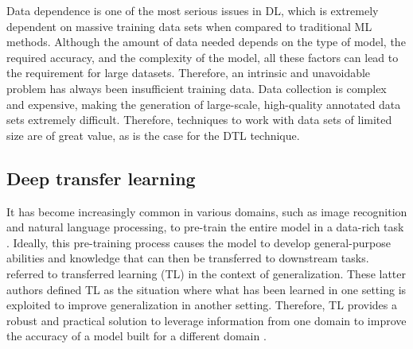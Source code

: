 \documentclass{aa}
\begin{document}
Data dependence is one of the most serious issues in DL, which is extremely dependent on massive training data {sets} when compared to traditional ML methods.
Although the amount of data needed depends on the type of model, the required accuracy, and the complexity of the model, all these factors can lead to the requirement for large datasets.
Therefore, an intrinsic and unavoidable problem has always been insufficient training data. Data collection is complex and expensive, making the generation of large-scale, high-quality annotated data sets extremely difficult. Therefore, techniques to work with data sets of limited size are of great value, as is the case for the DTL technique.


\subsection{Deep transfer learning} 
\label{sect:deep.transfer.learning}

It has become increasingly common in various domains, such as image recognition and natural language processing, to pre-train the entire model in a data-rich task \citep{kraus2017decision,gao2018deep,raffel2019exploring,HAN2021225}. 
Ideally, this pre-training process causes the model to develop general-purpose abilities and knowledge that can then be transferred to downstream tasks. 
\citet{Goodfellow-et-al-2016} referred to {transferred learning} (TL) in the context of generalization. 
These latter authors defined TL as the situation where what has been learned in one setting is exploited to improve generalization in another setting. Therefore, TL provides a robust and practical solution to leverage information from one domain to improve the accuracy of a model built for a different domain \citep{Vilalta2018}.
\end{document}
